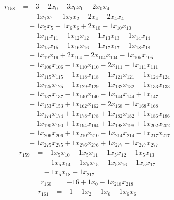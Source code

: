 \[\begin{aligned}
r_{158} &= + 3 - 2 x_{0} - 3 x_{0} x_{0} - 2 x_{0} x_{4} \\
 &\quad - 1 x_{1} x_{1} - 1 x_{2} x_{2} - 2 x_{4} - 2 x_{4} x_{4} \\
 &\quad - 1 x_{5} x_{5} - 1 x_{6} x_{6} + 2 x_{10} - 1 x_{10} x_{10} \\
 &\quad - 1 x_{11} x_{11} - 1 x_{12} x_{12} - 1 x_{13} x_{13} - 1 x_{14} x_{14} \\
 &\quad - 1 x_{15} x_{15} - 1 x_{16} x_{16} - 1 x_{17} x_{17} - 1 x_{18} x_{18} \\
 &\quad - 1 x_{19} x_{19} + 2 x_{104} - 2 x_{104} x_{104} - 1 x_{105} x_{105} \\
 &\quad - 1 x_{106} x_{106} - 1 x_{110} x_{110} - 2 x_{111} - 1 x_{111} x_{111} \\
 &\quad - 1 x_{115} x_{115} - 1 x_{118} x_{118} - 1 x_{121} x_{121} - 1 x_{124} x_{124} \\
 &\quad - 1 x_{125} x_{125} - 1 x_{129} x_{129} - 1 x_{132} x_{132} - 1 x_{133} x_{133} \\
 &\quad - 1 x_{137} x_{137} - 1 x_{140} x_{140} - 1 x_{144} x_{144} + 1 x_{147} \\
 &\quad + 1 x_{153} x_{153} + 1 x_{162} x_{162} - 2 x_{168} + 1 x_{168} x_{168} \\
 &\quad + 1 x_{174} x_{174} + 1 x_{178} x_{178} + 1 x_{182} x_{182} + 1 x_{186} x_{186} \\
 &\quad + 1 x_{190} x_{190} + 1 x_{194} x_{194} + 1 x_{198} x_{198} + 1 x_{202} x_{202} \\
 &\quad + 1 x_{206} x_{206} + 1 x_{210} x_{210} - 1 x_{214} x_{214} - 1 x_{217} x_{217} \\
 &\quad + 1 x_{275} x_{275} + 1 x_{276} x_{276} + 1 x_{277} + 1 x_{277} x_{277}
\end{aligned}\]
\[\begin{aligned}
r_{159} &= - 1 x_{5} x_{10} - 1 x_{5} x_{11} - 1 x_{5} x_{12} - 1 x_{5} x_{13} \\
 &\quad - 1 x_{5} x_{14} - 1 x_{5} x_{15} - 1 x_{5} x_{16} - 1 x_{5} x_{17} \\
 &\quad - 1 x_{5} x_{18} + 1 x_{217}
\end{aligned}\]
\[\begin{aligned}
r_{160} &= - 16 + 1 x_{0} - 1 x_{218} x_{218}
\end{aligned}\]
\[\begin{aligned}
r_{161} &= - 1 + 1 x_{2} + 1 x_{6} - 1 x_{6} x_{6}
\end{aligned}\]

